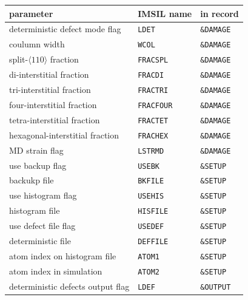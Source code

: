 \begin{center}
\begin{tabular}{lll}
   parameter \quad                   & IMSIL name     & in record \\
   \hline
   deterministic defect mode flag    & {\tt LDET}     & {\tt \&DAMAGE} \\
   coulumn width                     & {\tt WCOL}     & {\tt \&DAMAGE} \\
   split-$\langle 110 \rangle$ fraction   
                                     & {\tt FRACSPL}  & {\tt \&DAMAGE} \\
   di-interstitial fraction          & {\tt FRACDI}   & {\tt \&DAMAGE} \\
   tri-interstitial fraction         & {\tt FRACTRI}  & {\tt \&DAMAGE} \\
   four-interstitial fraction        & {\tt FRACFOUR} & {\tt \&DAMAGE} \\
   tetra-interstitial fraction       & {\tt FRACTET}  & {\tt \&DAMAGE} \\
   hexagonal-interstitial fraction   & {\tt FRACHEX}  & {\tt \&DAMAGE} \\
   MD strain flag                    & {\tt LSTRMD}   & {\tt \&DAMAGE} \\
   use backup flag                   & {\tt USEBK}    & {\tt \&SETUP}  \\
   backukp file                      & {\tt BKFILE}   & {\tt \&SETUP}  \\
   use histogram flag                & {\tt USEHIS}   & {\tt \&SETUP}  \\
   histogram file                    & {\tt HISFILE}  & {\tt \&SETUP}  \\
   use defect file flag              & {\tt USEDEF}   & {\tt \&SETUP}  \\
   deterministic file                & {\tt DEFFILE}  & {\tt \&SETUP}  \\
   atom index on histogram file      & {\tt ATOM1}    & {\tt \&SETUP}  \\
   atom index in simulation          & {\tt ATOM2}    & {\tt \&SETUP}  \\
   deterministic defects output flag & {\tt LDEF}     & {\tt \&OUTPUT} \\
\end{tabular}
\end{center}
